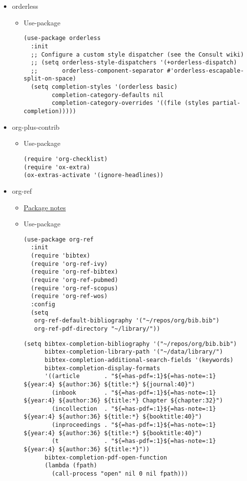 \documentclass{article}
\begin{document}
\begin{itemize}
\item orderless
\label{sec:org692590a}
\begin{itemize}
\item Use-package
\label{sec:org4c8b93b}
\begin{verbatim}
(use-package orderless
  :init
  ;; Configure a custom style dispatcher (see the Consult wiki)
  ;; (setq orderless-style-dispatchers '(+orderless-dispatch)
  ;;       orderless-component-separator #'orderless-escapable-split-on-space)
  (setq completion-styles '(orderless basic)
        completion-category-defaults nil
        completion-category-overrides '((file (styles partial-completion)))))

\end{verbatim}
\end{itemize}

\item org-plus-contrib
\label{sec:org22962b7}
\begin{itemize}
\item Use-package
\label{sec:org66dce62}
\begin{verbatim}
(require 'org-checklist)
(require 'ox-extra)
(ox-extras-activate '(ignore-headlines))

\end{verbatim}
\end{itemize}

\item org-ref
\label{sec:orga7246f3}
\begin{itemize}
\item \href{basecamp.org}{Package notes}
\label{sec:org7c83979}
\item Use-package
\label{sec:org7b17ffc}
\begin{verbatim}
(use-package org-ref
  :init
  (require 'bibtex)
  (require 'org-ref-ivy)
  (require 'org-ref-bibtex)
  (require 'org-ref-pubmed)
  (require 'org-ref-scopus)
  (require 'org-ref-wos)
  :config
  (setq
   org-ref-default-bibliography '("~/repos/org/bib.bib")
   org-ref-pdf-directory "~/library/"))
\end{verbatim}
\begin{verbatim}
(setq bibtex-completion-bibliography '("~/repos/org/bib.bib")
      bibtex-completion-library-path '("~/data/library/")
      bibtex-completion-additional-search-fields '(keywords)
      bibtex-completion-display-formats
      '((article       . "${=has-pdf=:1}${=has-note=:1} ${year:4} ${author:36} ${title:*} ${journal:40}")
        (inbook        . "${=has-pdf=:1}${=has-note=:1} ${year:4} ${author:36} ${title:*} Chapter ${chapter:32}")
        (incollection  . "${=has-pdf=:1}${=has-note=:1} ${year:4} ${author:36} ${title:*} ${booktitle:40}")
        (inproceedings . "${=has-pdf=:1}${=has-note=:1} ${year:4} ${author:36} ${title:*} ${booktitle:40}")
        (t             . "${=has-pdf=:1}${=has-note=:1} ${year:4} ${author:36} ${title:*}"))
      bibtex-completion-pdf-open-function
      (lambda (fpath)
        (call-process "open" nil 0 nil fpath)))


\end{verbatim}
\end{itemize}
\end{itemize}
\end{document}
